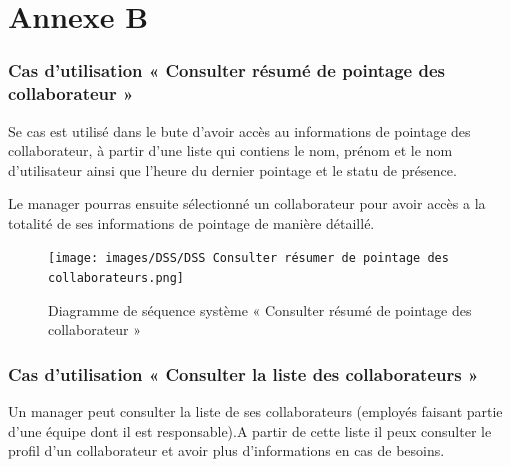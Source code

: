 \chapter*{Annexe B}\label{ch:annexeB}

 
 
 \subsection*{Cas d'utilisation « Consulter résumé de pointage des collaborateur »}
    Se cas est utilisé dans le bute d'avoir accès au informations de pointage des collaborateur, à partir d'une liste qui contiens le nom, prénom et le nom d'utilisateur ainsi que l'heure du dernier pointage et le statu de présence.
    
    Le manager pourras ensuite sélectionné un collaborateur pour avoir accès a la totalité de ses informations de pointage de manière détaillé.
        \begin{figure}[h!]
             \centering
            \texttt{[image: images/DSS/DSS Consulter résumer de pointage des collaborateurs.png]}
             \caption{Diagramme de séquence système « Consulter résumé de pointage des collaborateur »}
             \label{fig4}
        \end{figure}

    \subsection*{Cas d'utilisation « Consulter la liste des collaborateurs »}
    Un manager peut consulter la liste de ses collaborateurs (employés faisant partie d'une équipe dont il est responsable).A partir de cette liste il peux consulter le profil d'un collaborateur et avoir plus d'informations en cas de besoins.   
    
